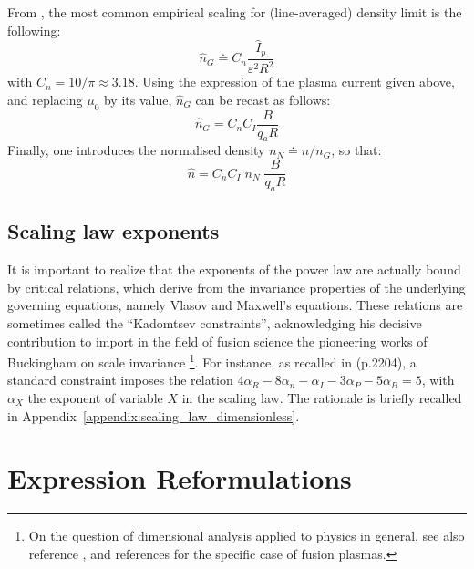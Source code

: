From \cite[eq.(14.146)]{Freidberg2007}, the most common empirical scaling for (line-averaged) density limit is the following:
\begin{equation}
\hat n_G \doteq C_n \frac{\hat I_p}{\varepsilon^2 R^2}
\label{eqn:greenwald_density_adv}
\end{equation}
with $C_n = 10/\pi \approx 3.18$.
Using the expression of the plasma current given above, and replacing $\mu_0$ by its value, $\hat n_G$ can be recast as follows:
\begin{equation*}
\hat n_G = C_nC_I \frac{B}{q_aR}
\end{equation*}
Finally, one introduces the normalised density $n_N\doteq n/ n_G$, so that:
\begin{equation}
\hat n = C_nC_I\; n_N\; \frac{B}{q_aR}
\label{eq:n_nN_adv}
\end{equation}


\subsection{Scaling law exponents}
It is important to realize that the exponents of the power law are actually bound by critical relations, which derive from the invariance properties of the underlying governing equations, namely Vlasov and Maxwell's equations. These relations are sometimes called the ``Kadomtsev constraints'', acknowledging his decisive contribution  to import in the field of fusion science the pioneering works of Buckingham on scale invariance \footnote{On the question of dimensional analysis applied to physics in general, see also reference \cite{Misic2010}, and references \cite{Connor1977, Luce2008} for the specific case of fusion plasmas.}. For instance, as recalled in \cite{ITERphysics_chap2} (p.2204), a standard constraint imposes the relation 
$4\alpha_R - 8\alpha_n - \alpha_I - 3\alpha_P - 5\alpha_B = 5$, with $\alpha_X$ the exponent of variable $X$ in the scaling law. The rationale is briefly recalled in Appendix~\ref{appendix:scaling_law_dimensionless}.

\section{Expression Reformulations}

